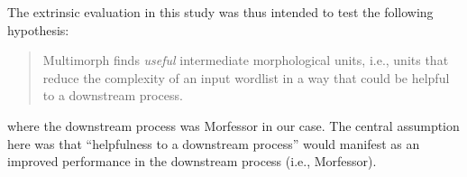 The extrinsic evaluation in this study was thus intended to test the following hypothesis:
\begin{quotation}\noindent
Multimorph finds \emph{useful} intermediate morphological units, i.e., units that reduce the
complexity of an input wordlist in a way that could be helpful to a downstream process.
\end{quotation}
where the downstream process was Morfessor in our case.
The central assumption here was that ``helpfulness to a downstream process''  would manifest as an improved performance in the downstream process (i.e., Morfessor). %

